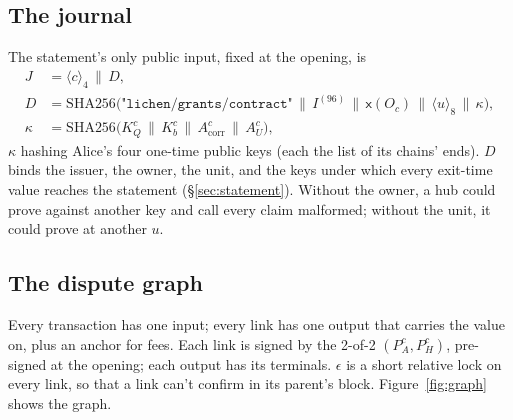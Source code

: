 \documentclass[11pt]{article}
\theoremstyle{plain}
\theoremstyle{definition}
\newcommand{\be}[2]{\langle #1\rangle_{#2}}
\newcommand{\xo}[1]{\mathsf{x}(#1)}
\newcommand{\PH}{P_H^{c}}
\newcommand{\Oc}{O_c}
\newcommand{\KQ}{K_{Q}^{c}}
\newcommand{\Kb}{K_{b}^{c}}
\newcommand{\Acorr}{A_{\mathrm{corr}}^{c}}
\newcommand{\AU}{A_{U}^{c}}
\begin{document}
\subsection{The journal}\label{sec:journal}

The statement's only public input, fixed at the opening, is
\begin{align*}
  J &= \be{c}{4} \,\|\, D,\\
  D &= \mathrm{SHA256}\big(\texttt{"lichen/grants/contract"} \,\|\,
  I^{(96)} \,\|\, \xo{\Oc} \,\|\, \be{u}{8} \,\|\, \kappa\big),\\
  \kappa &= \mathrm{SHA256}\big(\KQ \,\|\, \Kb \,\|\, \Acorr \,\|\, \AU\big),
\end{align*}
$\kappa$ hashing Alice's four one-time public keys (each the list of its
chains' ends). $D$ binds the issuer, the owner, the unit, and the keys
under which every exit-time value reaches the statement
(\S\ref{sec:statement}). Without the owner, a hub could prove against
another key and call every claim malformed; without the unit, it could
prove at another $u$.

\subsection{The dispute graph}\label{sec:graph}

Every transaction has one input; every link has one output that carries
the value on, plus an anchor for fees. Each link is signed by the 2-of-2
$(P_A^c, \PH)$, pre-signed at the opening; each output has its
terminals. $\epsilon$ is a short relative lock on every link, so that a
link can't confirm in its parent's block. Figure~\ref{fig:graph} shows
the graph.
\end{document}
